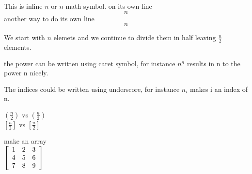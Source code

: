 \documentclass[12pt]{article}
\begin{document}
This is inline \(n\) or $n$ math symbol.
on its own line $$n$$
another way to do its own line \[n\]


We start with $n$ elemets and we continue to divide them in half 
leaving $\frac{n}{2}$ elements. 

the power can be written using caret symbol, for instance $n^n$ results in n to the power n nicely. 

The indices could be written using underscore, for instance $n_i$ makes i an index of n. 

$(\frac{n}{2})$
vs
$\left(\frac{n}{2}\right)$\\

$[\frac{n}{2}]$
vs
$\left[\frac{n}{2}\right]$

make an array\\
$
\left[
	\begin{array} {c c c}
		1&2&3\\
		4&5&6\\
		7&8&9
	\end{array}
\right]
$
\end{document}
